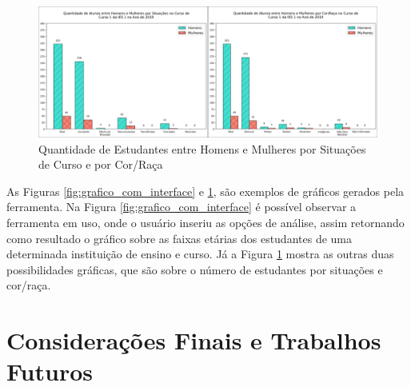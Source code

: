 \documentclass[12pt]{article}
\begin{document}

\begin{figure}[H]
\centering
\includegraphics[width=1\textwidth]{grafico_raca_situacao.png}
\caption{Quantidade de Estudantes entre Homens e Mulheres por Situações de Curso e por Cor/Raça}
\label{fig:grafico_raca_situacao}
\end{figure}

As Figuras \ref{fig:grafico_com_interface} e \ref{fig:grafico_raca_situacao}, são exemplos de gráficos gerados pela ferramenta. Na Figura \ref{fig:grafico_com_interface} é possível observar a ferramenta em uso, onde o usuário inseriu as opções de análise, assim retornando como resultado o gráfico sobre as faixas etárias dos estudantes de uma determinada instituição de ensino e curso. Já a Figura \ref{fig:grafico_raca_situacao} mostra as outras duas possibilidades gráficas, que são sobre o número de estudantes por situações e cor/raça.




\section{Considerações Finais e Trabalhos Futuros}
\end{document}
